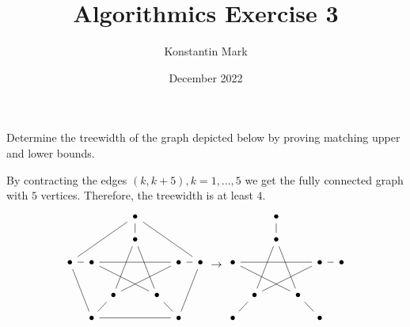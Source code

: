 \documentclass{article}
\title{Algorithmics Exercise 3}
\author{Konstantin Mark}
\date{December 2022}
\begin{document}
\maketitle


\listoftheorems[ignoreall,show={exercise}]

\newpage

\begin{exercise}
    Determine the treewidth of the graph depicted below by proving matching upper and lower bounds.
\end{exercise}
\begin{solving}
    By contracting the edges $(k, k+5), k = 1, \dots, 5$ we get the fully connected graph with $5$ vertices. Therefore, the treewidth is at least $4$.
     \begin{equation*}
         \begin{tikzcd}[column sep=tiny, row sep =small]
             &&& \bullet \\
	&&& \bullet \\
	\bullet & \bullet &&&& \bullet & \bullet \\
	\\
	&& \bullet && \bullet \\
	& \bullet &&&& \bullet
	\arrow[no head, from=2-4, to=5-5]
	\arrow[no head, from=2-4, to=5-3]
	\arrow[no head, from=3-2, to=3-6]
	\arrow[no head, from=3-2, to=5-5]
	\arrow[no head, from=3-6, to=5-3]
	\arrow[no head, from=5-3, to=6-2]
	\arrow[no head, from=3-1, to=3-2]
	\arrow[no head, from=3-6, to=3-7]
	\arrow[no head, from=5-5, to=6-6]
	\arrow[no head, from=2-4, to=1-4]
	\arrow[no head, from=1-4, to=3-1]
	\arrow[no head, from=1-4, to=3-7]
	\arrow[no head, from=3-7, to=6-6]
	\arrow[no head, from=6-2, to=6-6]
	\arrow[no head, from=3-1, to=6-2]
         \end{tikzcd} \to 
         \begin{tikzcd}[column sep=tiny, row sep =small]
	&& \bullet \\
	&& \bullet \\
	\bullet &&&& \bullet & \bullet \\
	\\
	& \bullet && \bullet \\
	\bullet &&&& \bullet
	\arrow[no head, from=2-3, to=5-4]
	\arrow[no head, from=2-3, to=5-2]
	\arrow[no head, from=3-1, to=3-5]
	\arrow[no head, from=3-1, to=5-4]
	\arrow[no head, from=3-5, to=5-2]
	\arrow[no head, from=5-2, to=6-1]
	\arrow[no head, from=3-5, to=3-6]
	\arrow[no head, from=5-4, to=6-5]
	\arrow[no head, from=2-3, to=1-3]

\end{tikzcd}
\end{equation*}
\end{solving}
\end{document}
